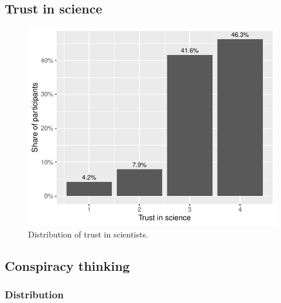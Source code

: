 \documentclass[
  doc,floatsintext]{apa6}
\begin{document}
\subsection{Trust in science}\label{trust-in-science-5}



\begin{figure}
\centering
\includegraphics{output/figures/exp2-trust-scientists.pdf}
\caption{\label{fig:exp2-trust-scientists}Distribution of trust in scientists.}
\end{figure}

\subsection{Conspiracy thinking}\label{conspiracy-thinking-1}

\subsubsection{Distribution}\label{distribution-1}
\end{document}

